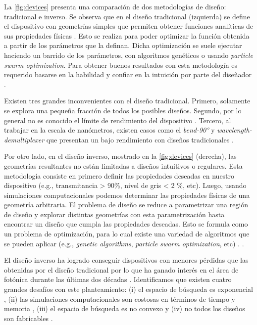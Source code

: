 La \autoref{fig:devices} presenta una comparación de dos metodologías de diseño: tradicional e inverso.
Se observa que en el diseño tradicional (izquierda) se define el dispositivo con geometrías simples que permiten obtener funciones analíticas de sus propiedades físicas \citep{Hughes2016, Song2008}. 
Esto se realiza para poder optimizar la función obtenida a partir de los parámetros que la definan. 
Dicha optimización se suele ejecutar haciendo un barrido de los parámetros, con algoritmos genéticos o usando \emph{particle swarm optimization}.
Para obtener buenos resultados con esta metodología es requerido basarse en la habilidad y confiar en la intuición por parte del diseñador \citep{Su2020}. 

Existen tres grandes inconvenientes con el diseño tradicional. 
Primero, solamente se explora una pequeña fracción de todos los posibles diseños.
Segundo, por lo general no es conocido el límite de rendimiento del dispositivo
\citep{Molesky2018}.
Tercero, al trabajar en la escala de nanómetros, existen casos como el
\emph{bend-90°} y \emph{wavelength-demultiplexer} que presentan un bajo rendimiento con diseños tradicionales \citep{Su2020}.

Por otro lado, en el diseño inverso, mostrado en la \autoref{fig:devices}
(derecha), las geometrías resultantes no están limitadas a diseños intuitivos o regulares.
Esta metodología consiste en primero definir las propiedades deseadas en nuestro dispositivo (e.g., transmitancia > 90\%, nivel de gris < 2 \%, etc).
Luego, usando simulaciones computacionales podemos determinar las propiedades físicas
de una geometría arbitraria. El problema de diseño se reduce a parametrizar una región
de diseño y explorar distintas geometrías con esta parametrización hasta encontrar un diseño
que cumpla las propiedades deseadas.
Esto se formula como un problema de optimización, para lo cual existe una variedad de algoritmos
que se pueden aplicar (e.g., \emph{genetic algorithms}, \emph{particle swarm optimization}, etc)
\citep{Molesky2018, Su2020}.
.


El diseño inverso ha logrado conseguir dispositivos con menores pérdidas que las obtenidas por el
diseño tradicional por lo que ha ganado interés en el área de fotónica durante
las últimas dos décadas \citep{Su2018, Molesky2018, Campbell2019}. 
Identificamos que existen cuatro grandes desafíos con este planteamiento:
(i) el espacio de búsqueda es exponencial \citep{Vuckovic2019}, 
(ii) las simulaciones computacionales son costosas en términos de tiempo y memoria \citep{Kudyshev2020}, 
(iii) el espacio de búsqueda es no convexo \citep{Su2018} y
(iv) no todos los diseños son fabricables \citep{Su2020}.


